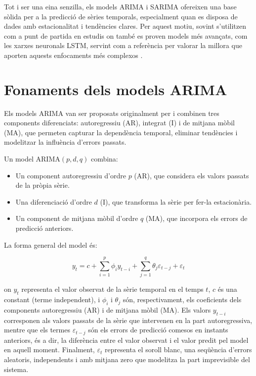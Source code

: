 \documentclass[../main.tex]{subfiles}
\begin{document}
Tot i ser una eina senzilla, els models ARIMA i SARIMA ofereixen una base sòlida per a la predicció de sèries temporals, especialment quan es disposa de dades amb estacionalitat i tendències clares. Per aquest motiu, sovint s’utilitzen com a punt de partida en estudis on també es proven models més avançats, com les xarxes neuronals LSTM, servint com a referència per valorar la millora que aporten aquests enfocaments més complexos \parencite{tugal2023analysis, de2020comparison}.



\section{Fonaments dels models ARIMA}

Els models ARIMA van ser proposats originalment per \textcite{box_jenkins} i combinen tres components diferenciats: autoregressiu (AR), integrat (I) i de mitjana mòbil (MA), que permeten capturar la dependència temporal, eliminar tendències i modelitzar la influència d’errors passats.

Un model ARIMA$(p,d,q)$ combina:

\begin{itemize}
    \item Un component autoregressiu d’ordre $p$ (AR), que considera els valors passats de la pròpia sèrie.
    \item Una diferenciació d’ordre $d$ (I), que transforma la sèrie per fer-la estacionària.
    \item Un component de mitjana mòbil d’ordre $q$ (MA), que incorpora els errors de predicció anteriors.
\end{itemize}

La forma general del model és:

\begin{equation}
y_t = c + \sum_{i=1}^{p} \phi_i y_{t-i} + \sum_{j=1}^{q} \theta_j \varepsilon_{t-j} + \varepsilon_t
\label{eq:arima_general}
\end{equation}

on $y_t$ representa el valor observat de la sèrie temporal en el temps $t$, $c$ és una constant (terme independent), i $\phi_i$ i $\theta_j$ són, respectivament, els coeficients dels components autoregressiu (AR) i de mitjana mòbil (MA). Els valors $y_{t-i}$ corresponen als valors passats de la sèrie que intervenen en la part autoregressiva, mentre que els termes $\varepsilon_{t-j}$ són els errors de predicció comesos en instants anteriors, és a dir, la diferència entre el valor observat i el valor predit pel model en aquell moment. Finalment, $\varepsilon_t$ representa el soroll blanc, una seqüència d’errors aleatoris, independents i amb mitjana zero que modelitza la part imprevisible del sistema.
\end{document}
